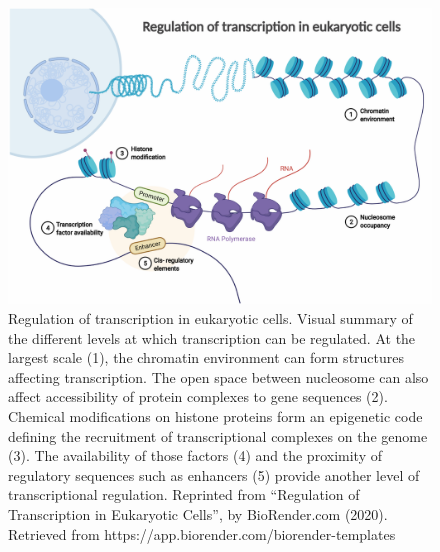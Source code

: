 \begin{figure}
    \includegraphics[width=\textwidth]{Parts/Part01/gfx/transcriptional_regulation_levels.pdf}
    \caption[Regulation of transcription in eukaryotic cells.]{Regulation of transcription in eukaryotic cells. Visual summary of the different levels at which transcription can be regulated. At the largest scale (1), the chromatin environment can form structures affecting transcription. The open space between nucleosome can also affect accessibility of protein complexes to gene sequences (2). Chemical modifications on histone proteins form an epigenetic code defining the recruitment of transcriptional complexes on the genome (3). The availability of those factors (4) and the proximity of regulatory sequences such as enhancers (5) provide another level of transcriptional regulation. Reprinted from “Regulation of Transcription in Eukaryotic Cells”, by BioRender.com (2020). Retrieved from https://app.biorender.com/biorender-templates }
    \label{fig:01-02:transcriptional-regulation}
\end{figure}


